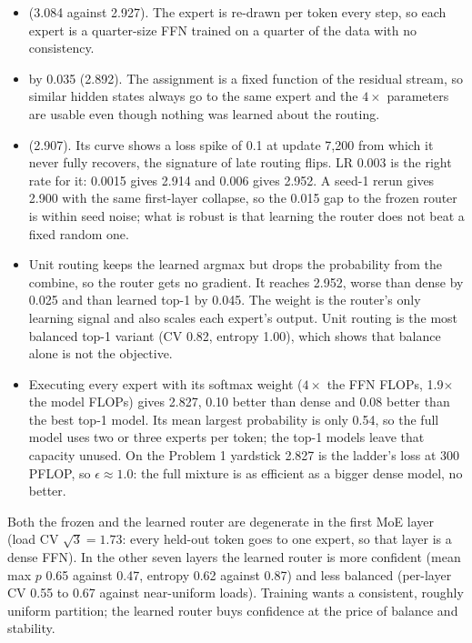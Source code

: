 \begin{itemize}
\item {} (3.084 against 2.927). The expert is re-drawn per token every step, so each expert is a quarter-size FFN trained on a quarter of the data with no consistency.
\item {} by 0.035 (2.892). The assignment is a fixed function of the residual stream, so similar hidden states always go to the same expert and the $4\times$ parameters are usable even though nothing was learned about the routing.
\item {} (2.907). Its curve shows a loss spike of 0.1 at update 7,200 from which it never fully recovers, the signature of late routing flips. LR 0.003 is the right rate for it: 0.0015 gives 2.914 and 0.006 gives 2.952. A seed-1 rerun gives 2.900 with the same first-layer collapse, so the 0.015 gap to the frozen router is within seed noise; what is robust is that learning the router does not beat a fixed random one.
\item {} Unit routing keeps the learned argmax but drops the probability from the combine, so the router gets no gradient. It reaches 2.952, worse than dense by 0.025 and than learned top-1 by 0.045. The weight is the router's only learning signal and also scales each expert's output. Unit routing is the most balanced top-1 variant (CV 0.82, entropy 1.00), which shows that balance alone is not the objective.
\item {} Executing every expert with its softmax weight ($4\times$ the FFN FLOPs, 1.9$\times$ the model FLOPs) gives 2.827, 0.10 better than dense and 0.08 better than the best top-1 model. Its mean largest probability is only 0.54, so the full model uses two or three experts per token; the top-1 models leave that capacity unused. On the Problem 1 yardstick 2.827 is the ladder's loss at 300 PFLOP, so $\epsilon\approx1.0$: the full mixture is as efficient as a bigger dense model, no better.
\end{itemize}

 Both the frozen and the learned router are degenerate in the first MoE layer (load CV $\sqrt3=1.73$: every held-out token goes to one expert, so that layer is a dense FFN). In the other seven layers the learned router is more confident (mean max $p$ 0.65 against 0.47, entropy 0.62 against 0.87) and less balanced (per-layer CV 0.55 to 0.67 against near-uniform loads). Training wants a consistent, roughly uniform partition; the learned router buys confidence at the price of balance and stability.

